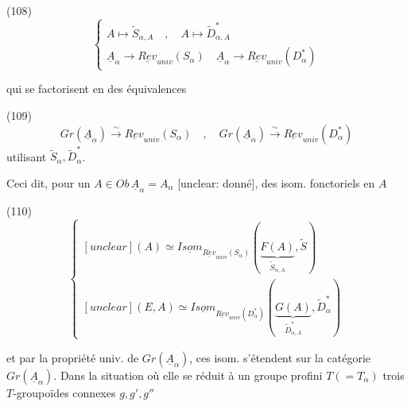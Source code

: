 (108)
$$ \begin{cases} 
A \longmapsto \tilde{S}_{\alpha,A} \quad , \quad A \longmapsto \tilde{D}_{\alpha,A}^* \\ 
\underline{A}_\alpha \longrightarrow \underline{Rev}_{univ}(S_\alpha) \quad \underline{A}_\alpha \longrightarrow \underline{Rev}_{univ}(D_\alpha^*) 
\end{cases} $$

qui se factorisent en des équivalences

(109)
$$ Gr(\underline{A}_\alpha) \xrightarrow{\sim} \underline{Rev}_{univ}(S_\alpha) \quad , \quad Gr(\underline{A}_\alpha) \xrightarrow{\sim} \underline{Rev}_{univ}(D_\alpha^*) $$
utilisant $\tilde{S}_\alpha, \tilde{D}_\alpha^*$.

Ceci dit, pour un $A \in Ob \, \underline{A}_\alpha = A_\alpha$ [unclear: donné],
des isom. fonctoriels en $A$

(110)
$$ \begin{cases} 
[unclear](A) \simeq \underline{Isom}_{\underline{Rev}_{univ}(S_\alpha)}(\underbrace{F(A)}_{\tilde{S}_{\alpha,A}}, \tilde{S}) \\ 
[unclear](E,A) \simeq \underline{Isom}_{\underline{Rev}_{univ}(D_\alpha^*)}(\underbrace{G(A)}_{\tilde{D}_{\alpha,A}^*}, \tilde{D}_\alpha^*) 
\end{cases} $$

et par la propriété univ. de $Gr(\underline{A}_\alpha)$,
ces isom. s'étendent sur la
catégorie $Gr(\underline{A}_\alpha)$. Dans la situation où
elle se réduit à un groupe profini $T (= T_\alpha)$
trois $T$-groupoïdes connexes $g, g', g''$

\newpage


